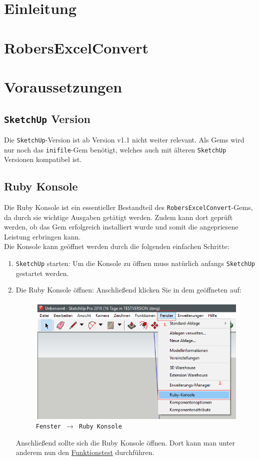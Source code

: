 \documentclass{book}
\newcommand{\sketchup}{\texttt{SketchUp}\xspace}
\newcommand{\inifile}{\texttt{inifile}\xspace}
\newcommand{\robersexcelconvert}{\texttt{RobersExcelConvert}\xspace}
\begin{document}
	
	
	
	\tableofcontents
	\chapter{Einleitung}
		
	\chapter{RobersExcelConvert} \label{RobersExcelConvert}
		
	\label{REC - Ablauf}
	\chapter{Voraussetzungen}
		\section{\sketchup Version} \label{sketchup version}
			Die \sketchup-Version ist ab Version v1.1 nicht weiter relevant. Als Gems wird nur noch das \inifile-Gem benötigt, welches auch mit älteren \sketchup Versionen kompatibel ist.
		\section{Ruby Konsole} \label{Ruby Konsole}
			Die Ruby Konsole ist ein essentieller Bestandteil des \robersexcelconvert-Gems, da durch sie wichtige Ausgaben getätigt werden. Zudem kann dort geprüft werden, ob das Gem erfolgreich installiert wurde und somit die angepriesene Leistung erbringen kann.\\
			Die Konsole kann geöffnet werden durch die folgenden einfachen Schritte:
				\begin{enumerate}
					\item \sketchup starten:
						Um die Konsole zu öffnen muss natürlich anfangs \sketchup gestartet werden.
					\item Die Ruby Konsole öffnen:
						Anschließend klicken Sie in dem geöffneten auf:
						\begin{figure}[H]
							\centering
							\includegraphics[scale=0.6]{pics/Ruby-Konsole-oeffnen.png}\\
							\texttt{Fenster $\rightarrow$ Ruby Konsole}							
						\end{figure}
						Anschließend sollte sich die Ruby Konsole öffnen. Dort kann man unter anderem nun den \hyperref[Funktionstest]{Funktionstest} durchführen.
				\end{enumerate}
\end{document}
